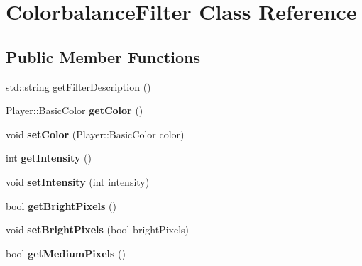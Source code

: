\hypertarget{classPlayer_1_1ColorbalanceFilter}{}\section{Colorbalance\+Filter Class Reference}
\label{classPlayer_1_1ColorbalanceFilter}
\subsection*{Public Member Functions}
\begin{DoxyCompactItemize}
\item 
std\+::string \hyperlink{classPlayer_1_1ColorbalanceFilter_a2b3f7d8fcd3d774b4a2fde5914a9729f}{get\+Filter\+Description} ()
\item 
\hypertarget{classPlayer_1_1ColorbalanceFilter_a8a1b3fcb7c0a8e49463bbdb14f8719a2}{}Player\+::\+Basic\+Color {\bfseries get\+Color} ()\label{classPlayer_1_1ColorbalanceFilter_a8a1b3fcb7c0a8e49463bbdb14f8719a2}

\item 
\hypertarget{classPlayer_1_1ColorbalanceFilter_a37eff4372ee39d0014583b323f0d97d9}{}void {\bfseries set\+Color} (Player\+::\+Basic\+Color color)\label{classPlayer_1_1ColorbalanceFilter_a37eff4372ee39d0014583b323f0d97d9}

\item 
\hypertarget{classPlayer_1_1ColorbalanceFilter_a708995fb1b6acb31ee0dfb0f4881e5b5}{}int {\bfseries get\+Intensity} ()\label{classPlayer_1_1ColorbalanceFilter_a708995fb1b6acb31ee0dfb0f4881e5b5}

\item 
\hypertarget{classPlayer_1_1ColorbalanceFilter_ac8255ffbc46bb61acaa8fd23d0d260eb}{}void {\bfseries set\+Intensity} (int intensity)\label{classPlayer_1_1ColorbalanceFilter_ac8255ffbc46bb61acaa8fd23d0d260eb}

\item 
\hypertarget{classPlayer_1_1ColorbalanceFilter_a1be0d343ed58d5d5bf7b816da375f190}{}bool {\bfseries get\+Bright\+Pixels} ()\label{classPlayer_1_1ColorbalanceFilter_a1be0d343ed58d5d5bf7b816da375f190}

\item 
\hypertarget{classPlayer_1_1ColorbalanceFilter_af0f286aa4c54fb1fd5813d02799da1cb}{}void {\bfseries set\+Bright\+Pixels} (bool bright\+Pixels)\label{classPlayer_1_1ColorbalanceFilter_af0f286aa4c54fb1fd5813d02799da1cb}

\item 
\hypertarget{classPlayer_1_1ColorbalanceFilter_a71d3e0e416aa251b66678a14b4bfa1a1}{}bool {\bfseries get\+Medium\+Pixels} ()\label{classPlayer_1_1ColorbalanceFilter_a71d3e0e416aa251b66678a14b4bfa1a1}


\end{DoxyCompactItemize}
